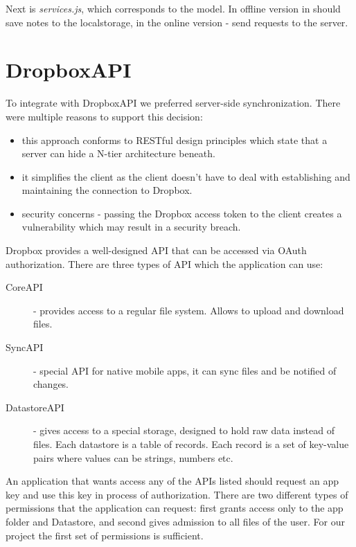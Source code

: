 \documentclass[12pt,a4paper]{article}
\begin{document}
Next is \textit{services.js}, which corresponds to the model. In offline version
in should save notes to the localstorage, in the online version - send requests
to the server.

\section{DropboxAPI}

To integrate with DropboxAPI we preferred server-side synchronization.
There were multiple reasons to support this decision:

\begin{itemize}
\item this approach conforms to RESTful design principles which state
  that a server can hide a N-tier architecture beneath.
\item it simplifies the client as the client doesn't have to deal with
  establishing and maintaining the connection to Dropbox.
\item security concerns - passing the Dropbox access token to the
  client creates a vulnerability which may result in a security breach.
\end{itemize}

Dropbox provides a well-designed API that can be accessed via OAuth
authorization. There are three types of API which the application can
use:

\begin{description}
\item[CoreAPI] - provides access to a regular file system. Allows to
  upload and download files.

\item[SyncAPI] - special API for native mobile apps, it can sync files
  and be notified of changes.

\item[DatastoreAPI] - gives access to a special storage, designed to
  hold raw data instead of files. Each datastore is a table of
  records. Each record is a set of key-value pairs where values can be
  strings, numbers etc.
\end{description}

An application that wants access any of the APIs listed should request
an app key and use this key in process of authorization. There are two
different types of permissions that the application can request: first
grants access only to the app folder and Datastore, and second gives
admission to all files of the user. For our project the first set of
permissions is sufficient.
\end{document}
